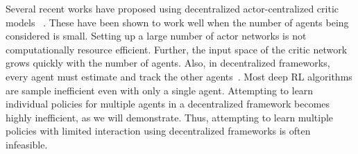 \documentclass{article}
\begin{document}
Several recent works have proposed using decentralized actor-centralized critic models ~\cite{foerster2017counterfactual,lowe2017multi}. These have been shown to work well when the number of agents being considered is small. Setting up a large number of actor networks is not computationally resource efficient. Further, the input space of the critic network grows quickly with the number of agents. Also, in decentralized frameworks, every agent must estimate and track the other agents~\cite{da2006dealing,sutton2007role}. Most deep RL algorithms are sample inefficient even with only a single agent. Attempting to learn individual policies for multiple agents in a decentralized framework becomes highly inefficient, as we will demonstrate. Thus, attempting to learn multiple policies with limited interaction using decentralized frameworks is often infeasible. 
\end{document}
